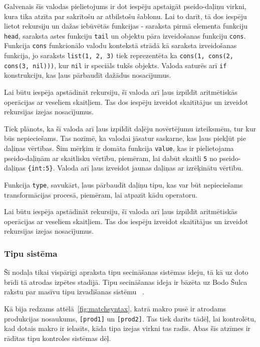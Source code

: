 Galvenais šīs valodas pielietojums ir dot iespēju apstaigāt pseido-daļiņu virkni, kura tika atzīta par sakrītošu ar atbilstošu šablonu. Lai to darīt, tā dos iespēju lietot rekursiju un dažas iebūvētās funkcijas - saraksta pirmā elementa funkciju \verb|head|, saraksta astes funkciju \verb|tail| un objektu pāra izveidošanas funkciju \verb|cons|. Funkcija \verb|cons| funkcionālo valodu kontekstā strādā kā saraksta izveidošanas funkcija, jo saraksts \verb|list(1, 2, 3)| tiek reprezentēta ka \verb|cons(1, cons(2, cons(3, nil)))|, kur \verb|nil| ir speciāls tukšs objekts. Valoda saturēs arī \verb|if| konstrukciju, kas ļaus pārbaudīt dažādus nosacījumus.

Lai būtu iespēja apstādināt rekursiju, šī valoda arī ļaus izpildīt aritmētiskās operācijas ar veseliem skaitļiem. Tas dos iespēju izveidot skaitītājus un izveidot rekursijas izejas nosacījumus.

Tiek plānots, ka šī valoda arī ļaus izpildīt daļēju novērtējumu izteiksmēm, tur kur būs nepieciešams. Tas nozīmē, ka valodai jāsatur saskarne, kas ļaus piekļūt pie daļiņas vērtības. Šim mērķim ir domāta funkcija \verb|value|, kas ir pielietojama pseido-daļiņām ar skaitlisku vērtību, piemēram, lai dabūt skaitli \verb|5| no pseido-daļiņas \verb|{int:5}|. Valoda arī ļaus izveidot jaunas daļiņas ar izrēķinātu vērtību.

Funkcija \verb|type|, savukārt, ļaus pārbaudīt daļiņu tipu, kas var būt nepieciešams transformācijas procesā, piemēram, lai atpazīt kādu operatoru.

Lai būtu iespēja apstādināt rekursiju, šī valoda arī ļaus izpildīt aritmētiskās operācijas ar veseliem skaitļiem. Tas dos iespēju izveidot skaitītājus un izveidot rekursijas izejas nosacījumus.

\subsubsection{\label{sbsbs:sys_typesystem}Tipu sistēma}

Šī nodaļa tikai vispārīgi apraksta tipu secināšanas sistēmas ideju, tā kā uz doto brīdi tā atrodas izpētes stadijā. Tipu secināšanas ideja ir bāzēta uz Bodo Šulca rakstu par masīvu tipu izvadīšanas sistēmu ~\cite{Scholz:SACTypeSystem}.

Kā bija redzams attēlā~\ref{fig:matchsyntax}, katrā makro pusē ir atrodams produkcijas nosaukums, \verb|[prod1]| un \verb|[prod2]|. Tas tiek darīts tādēļ, lai kontrolētu, kad dotais makro ir ielasīts, kāda tipa izejas virkni tas radīs. Abas šīs atzīmes ir rādītas tipu kontroles sistēmas dēļ.

